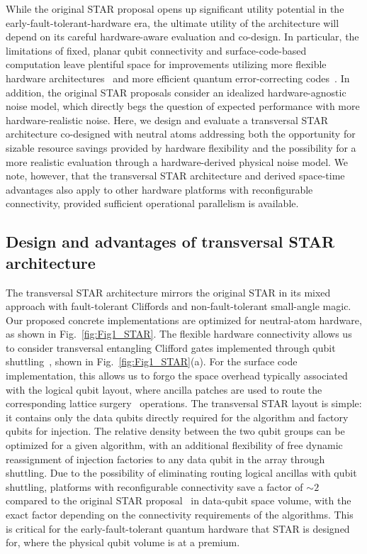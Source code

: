 \documentclass[aps, prx, reprint, superscriptaddress, longbibliography, floatfix]{revtex4-2}
\begin{document}
While the original STAR proposal opens up significant utility potential in the early-fault-tolerant-hardware era, the ultimate utility of the architecture will depend on its careful hardware-aware evaluation and co-design. In particular, the limitations of fixed, planar qubit connectivity and surface-code-based computation leave plentiful space for improvements utilizing more flexible hardware architectures~\cite{Bluvstein2024, Moses2023} and more efficient quantum error-correcting codes~\cite{Breuckmann2021}. In addition, the original STAR proposals consider an idealized hardware-agnostic noise model, which directly begs the question of expected performance with more hardware-realistic noise. Here, we design and evaluate a transversal STAR architecture co-designed with neutral atoms addressing both the opportunity for sizable resource savings provided by hardware flexibility and the possibility for a more realistic evaluation through a hardware-derived physical noise model. We note, however, that the transversal STAR architecture and derived space-time advantages also apply to other hardware platforms with reconfigurable connectivity, provided sufficient operational parallelism is available.

\subsection{Design and advantages of transversal STAR architecture}
\label{sec:stardesign}

The transversal STAR architecture mirrors the original STAR in its mixed approach with fault-tolerant Cliffords and non-fault-tolerant small-angle magic. Our proposed concrete implementations are optimized for neutral-atom hardware, as shown in Fig.~\ref{fig:Fig1_STAR}. The flexible hardware connectivity allows us to consider transversal entangling Clifford gates implemented through qubit shuttling~\cite{Bluvstein2024}, shown in Fig.~\ref{fig:Fig1_STAR}(a). For the surface code implementation, this allows us to forgo the space overhead typically associated with the logical qubit layout, where ancilla patches are used to route the corresponding lattice surgery~\cite{Fowler2019} operations. The transversal STAR layout is simple: it contains only the data qubits directly required for the algorithm and factory qubits for injection. The relative density between the two qubit groups can be optimized for a given algorithm, with an additional flexibility of free dynamic reassignment of injection factories to any data qubit in the array through shuttling. Due to the possibility of eliminating routing logical ancillas with qubit shuttling, platforms with reconfigurable connectivity save a factor of $\sim 2$ compared to the original STAR proposal~\cite{Akahoshi2024} in data-qubit space volume, with the exact factor depending on the connectivity requirements of the algorithms. This is critical for the early-fault-tolerant quantum hardware that STAR is designed for, where the physical qubit volume is at a premium. 
\end{document}

